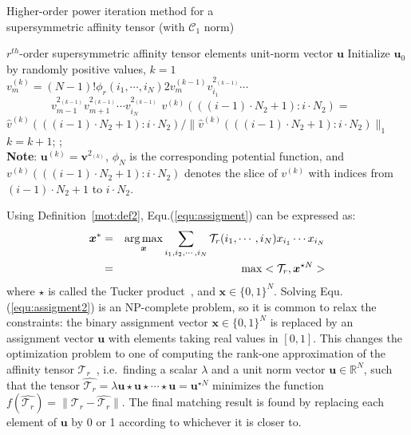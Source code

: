 \begin{algorithm}[!t]
\caption{\small Higher-order power iteration method for a \protect\\
         \mbox{}\hspace{15ex}\small supersymmetric affinity tensor (with $\mathcal{C}_1$ norm)}
\label{alg2}
\begin{algorithmic}[1]
\REQUIRE \small $r^{th}$-order supersymmetric affinity tensor elements
\ENSURE  \small unit-norm vector $\boldsymbol{u}$
\STATE   \small \; Initialize $\boldsymbol{u}_0$ by randomly positive values, $k=1$
\REPEAT
        \STATE $v_{m}^{(k)}=(N-1)!\phi_r(i_1,\cdots , i_N) 2v_{m}^{(k-1)}v_{i_1}^{2_{(k-1)}}\cdots$ \\
                 $\qquad \qquad v_{m-1}^{2_{(k-1)}}v_{m+1}^{2_{(k-1)}}\cdots v_{i_N}^{2_{(k-1)}}$
        \ENDFOR
        \STATE $v^{(k)}(((i-1)\cdot N_2+1) : i\cdot N_2)=$   \protect\\
               $\hat{v}^{(k)}(((i-1)\cdot N_2+1) : i\cdot N_2)/\lVert \hat{v}^{(k)}(((i-1)\cdot N_2+1):i\cdot N_2)\lVert_1$
        \ENDFOR
    \ENDFOR
    \STATE $k=k+1$;
;\protect\\
       \small \textbf{Note}: $\boldsymbol{u}^{(k)}=\boldsymbol{v}^{2_{(k)}}$, $\phi_N$ is the corresponding potential function,
       \small and $v^{(k)}(((i-1)\cdot N_2+1) : i\cdot N_2)$ denotes the slice of $v^{(k)}$ with
       \small indices from $(i-1)\cdot N_2+1$ to $i\cdot N_2$.
\end{algorithmic}
\end{algorithm}

Using Definition~\ref{mot:def2}, Equ.(\ref{equ:assigment}) can be expressed as:
\begin{eqnarray}
\label{equ:assigment2}
{\boldsymbol{x}}^* &=& \operatorname*{arg\,max}_{\boldsymbol{x}} \sum_{i_1,i_2,\cdots,i_N} \mathcal{T}_r(i_1,\cdots,i_N) x_{i_1} \cdots x_{i_N} \nonumber\\
&=& \max <\mathcal{T}_r, \boldsymbol{x}^{\star N}>
\end{eqnarray}
where $\star$ is called the Tucker product~\cite{Kofidis02}, and $\boldsymbol{x} \in \{0,1\}^{N}$.
Solving Equ.(\ref{equ:assigment2}) is an NP-complete problem,
so it is common to relax the constraints:
the binary assignment vector $\boldsymbol{x}\in \{0,1\}^{N}$ is replaced by an assignment vector $\boldsymbol{u}$ with elements taking real values in $[0,1]$.
This changes the optimization problem to one of computing the rank-one approximation of the affinity tensor $\mathcal{T}_r$~\cite{Kofidis02},
i.e.\ finding a scalar $\lambda$ and a unit norm vector $\boldsymbol{u}\in \mathbb{R}^{N}$,
such that the tensor $\hat{\mathcal{T}_r} = \lambda \boldsymbol{u}\star \boldsymbol{u} \star\cdots \star \boldsymbol{u}=\boldsymbol{u}^{\star N}$ minimizes the function $f(\hat{\mathcal{T}_r})=\lVert \mathcal{T}_r-\hat{\mathcal{T}_r} \lVert$.
The final matching result is found by replacing each element of $\boldsymbol{u}$ by 0 or 1 according to whichever it is closer to.

